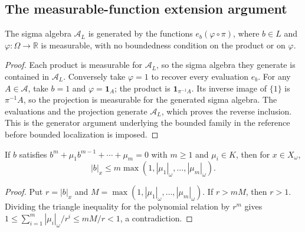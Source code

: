 \subsection{The measurable-function extension argument}

\begin{lemma}
\label{lem:evaluation-products-generate}
\leanok
{}
The sigma algebra $\mathcal A_L$ is generated by the functions
$e_b(\varphi\circ\pi)$, where $b\in L$ and
$\varphi:\Omega\to\mathbb R$ is measurable, with no boundedness
condition on the product or on $\varphi$.
\end{lemma}
\begin{proof}
Each product is measurable for $\mathcal A_L$, so the sigma algebra
they generate is contained in $\mathcal A_L$. Conversely take
$\varphi=1$ to recover every evaluation $e_b$. For any
$A\in\mathcal A$, take $b=1$ and $\varphi=\mathbf1_A$; the product
is $\mathbf1_{\pi^{-1}A}$. Its inverse image of $\{1\}$ is
$\pi^{-1}A$, so the projection is measurable for the generated sigma
algebra. The evaluations and the projection generate $\mathcal A_L$,
which proves the reverse inclusion. This is the generator argument
underlying the bounded family in the reference before bounded
localization is imposed.
\end{proof}

\begin{lemma}\label{lem:algebraic-root-bound}
\leanok
{}
If $b$ satisfies $b^m+\mu_1b^{m-1}+\cdots+\mu_m=0$ with $m\geq1$
and $\mu_i\in K$, then for $x\in X_\omega$,
\[
 |b|_x\leq m\max(1,|\mu_1|_\omega,\ldots,|\mu_m|_\omega).
\]
\end{lemma}
\begin{proof}
Put $r=|b|_x$ and $M=\max(1,|\mu_1|_\omega,\ldots,|\mu_m|_\omega)$.
If $r>mM$, then $r>1$. Dividing the triangle inequality for the polynomial
relation by $r^m$ gives
$1\leq\sum_{i=1}^m|\mu_i|_\omega/r^i\leq mM/r<1$, a contradiction.
\end{proof}

